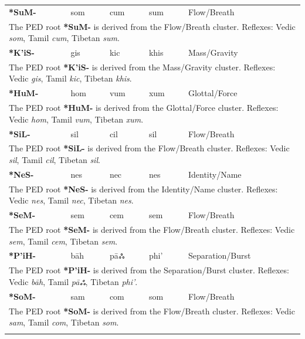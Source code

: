 \begin{longtable}{p{} p{} p{} p{} p{}}
\textbf{*SuM-} & som & cum & sum & Flow/Breath \\ 
\multicolumn{5}{p{\textwidth}}{\small The PED root \textbf{*SuM-} is derived from the Flow/Breath cluster. Reflexes: Vedic \textit{som}, Tamil \textit{cum}, Tibetan \textit{sum}. } \\ \addlinespace 
\textbf{*K'iS-} & gis & kic & khis & Mass/Gravity \\ 
\multicolumn{5}{p{\textwidth}}{\small The PED root \textbf{*K'iS-} is derived from the Mass/Gravity cluster. Reflexes: Vedic \textit{gis}, Tamil \textit{kic}, Tibetan \textit{khis}. } \\ \addlinespace 
\textbf{*HuM-} & hom & vum & xum & Glottal/Force \\ 
\multicolumn{5}{p{\textwidth}}{\small The PED root \textbf{*HuM-} is derived from the Glottal/Force cluster. Reflexes: Vedic \textit{hom}, Tamil \textit{vum}, Tibetan \textit{xum}. } \\ \addlinespace 
\textbf{*SiL-} & sil & cil & sil & Flow/Breath \\ 
\multicolumn{5}{p{\textwidth}}{\small The PED root \textbf{*SiL-} is derived from the Flow/Breath cluster. Reflexes: Vedic \textit{sil}, Tamil \textit{cil}, Tibetan \textit{sil}. } \\ \addlinespace 
\textbf{*NeS-} & nes & nec & nes & Identity/Name \\ 
\multicolumn{5}{p{\textwidth}}{\small The PED root \textbf{*NeS-} is derived from the Identity/Name cluster. Reflexes: Vedic \textit{nes}, Tamil \textit{nec}, Tibetan \textit{nes}. } \\ \addlinespace 
\textbf{*SeM-} & sem & cem & sem & Flow/Breath \\ 
\multicolumn{5}{p{\textwidth}}{\small The PED root \textbf{*SeM-} is derived from the Flow/Breath cluster. Reflexes: Vedic \textit{sem}, Tamil \textit{cem}, Tibetan \textit{sem}. } \\ \addlinespace 
\textbf{*P'iH-} & bāh & pāஃ & phi' & Separation/Burst \\ 
\multicolumn{5}{p{\textwidth}}{\small The PED root \textbf{*P'iH-} is derived from the Separation/Burst cluster. Reflexes: Vedic \textit{bāh}, Tamil \textit{pāஃ}, Tibetan \textit{phi'}. } \\ \addlinespace 
\textbf{*SoM-} & sam & com & som & Flow/Breath \\ 
\multicolumn{5}{p{\textwidth}}{\small The PED root \textbf{*SoM-} is derived from the Flow/Breath cluster. Reflexes: Vedic \textit{sam}, Tamil \textit{com}, Tibetan \textit{som}. } \\ \addlinespace 

\end{longtable}
